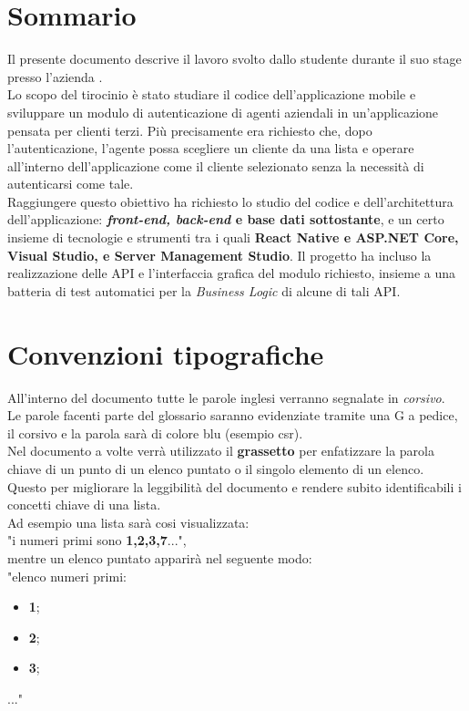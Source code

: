 \cleardoublepage
{}
{}
\begingroup
\let\clearpage\relax
\let\cleardoublepage\relax
\chapter*{Sommario}

Il presente documento descrive il lavoro svolto dallo studente {\myName} durante il suo stage presso l’azienda {\companyLong}.\\
Lo scopo del tirocinio è stato studiare il codice dell’applicazione mobile {\movi} e sviluppare un modulo di autenticazione di agenti aziendali 
in un'applicazione pensata per clienti terzi. Più precisamente era richiesto che, dopo l’autenticazione, l’agente possa scegliere un cliente da una 
lista e operare all’interno dell’applicazione come il cliente selezionato senza la necessità di autenticarsi come tale.\\
Raggiungere questo obiettivo ha richiesto lo studio del codice e dell’architettura dell’applicazione: \textbf{\textit{front-end, back-end} e base dati 
sottostante}, e un certo insieme di tecnologie e strumenti tra i quali \textbf{React Native e ASP.NET Core, Visual Studio, e Server Management Studio}. 
Il progetto ha incluso la realizzazione delle API e l’interfaccia grafica del modulo richiesto, insieme a una batteria di test automatici per la 
\textit{Business Logic} di alcune di tali API.

\newpage

\chapter*{Convenzioni tipografiche}
All'interno del documento tutte le parole inglesi verranno segnalate in \textit{corsivo}.\\
Le parole facenti parte del glossario saranno evidenziate tramite una G a pedice, il corsivo e la parola sarà di colore blu (esempio \gls{csr}).\\
Nel documento a volte verrà utilizzato il \textbf{grassetto} per enfatizzare la parola chiave di un punto di un elenco puntato o il singolo elemento di un elenco. 
Questo per migliorare la leggibilità del documento e rendere subito identificabili i concetti chiave di una lista.\\
Ad esempio una lista sarà cosi visualizzata:\\
"i numeri primi sono \textbf{1,2,3,7}...", \\
mentre un elenco puntato apparirà nel seguente modo:\\
"elenco numeri primi:
\begin{itemize}
    \item \textbf{1};\item \textbf{2};\item \textbf{3};
\end{itemize}
..."

